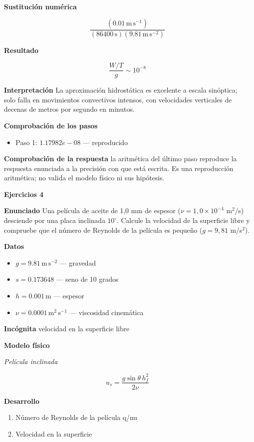 \documentclass[10pt,openany]{book}
\begin{document}
\noindent\textbf{Sustitución numérica}

\[
\frac{\left(0.01\,\mathrm{m}\,\mathrm{s}^{-1}\right)}{\left(86400\,\mathrm{s}\right) \left(9.81\,\mathrm{m}\,\mathrm{s}^{-2}\right)}
\]

\noindent\textbf{Resultado}

\[
\frac{W/T}{g} \sim 10^{-8}
\]

\noindent\textbf{Interpretación}
La aproximación hidrostática es excelente a escala sinóptica; solo falla en movimientos convectivos intensos, con velocidades verticales de decenas de metros por segundo en minutos.

\noindent\textbf{Comprobación de los pasos}
\begin{itemize}
\item Paso 1: $1.17982e-08$ — reproducido
\end{itemize}

\noindent\textbf{Comprobación de la respuesta} la aritmética del último paso reproduce la respuesta enunciada a la precisión con que está escrita. Es una reproducción aritmética; no valida el modelo físico ni sus hipótesis.

\noindent\textbf{Ejercicios 4}

\noindent\textbf{Enunciado}
Una película de aceite de 1,0 mm de espesor (\(\nu = 1{,}0\times 10^{-4}\) m\(^2\)/s) desciende por una placa inclinada \(10^\circ\). Calcule la velocidad de la superficie libre y compruebe que el número de Reynolds de la película es pequeño (\(g = 9{,}81\) m/s\(^2\)).

\noindent\textbf{Datos}
\begin{itemize}
\item $g = 9.81\,\mathrm{m}\,\mathrm{s}^{-2}$ — gravedad
\item $s = 0.173648$ — seno de 10 grados
\item $h = 0.001\,\mathrm{m}$ — espesor
\item $\nu = 0.0001\,\mathrm{m}^{2}\,\mathrm{s}^{-1}$ — viscosidad cinemática
\end{itemize}

\noindent\textbf{Incógnita}
velocidad en la superficie libre

\noindent\textbf{Modelo físico}

\noindent\textit{Película inclinada}

\[
u_s = \frac{g\sin\theta\,h_f^{2}}{2\nu}
\]

\noindent\textbf{Desarrollo}
\begin{enumerate}
\item
Número de Reynolds de la película q/nu
\item
Velocidad en la superficie
\end{enumerate}
\end{document}
